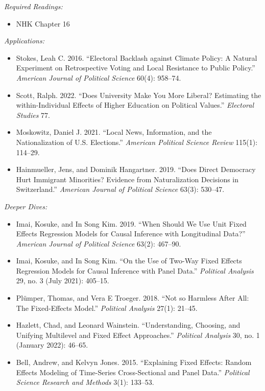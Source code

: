 \documentclass[11pt, letterpaper]{article}
\begin{document}
\textit{Required Readings:}

\begin{itemize}
	\item NHK Chapter 16
\end{itemize}

\noindent \textit{Applications:}

\begin{itemize}
	\item Stokes, Leah C. 2016. ``Electoral Backlash against Climate Policy: A Natural Experiment on Retrospective Voting and Local Resistance to Public Policy.'' \textit{American Journal of Political Science} 60(4): 958–74.
	\item Scott, Ralph. 2022. “Does University Make You More Liberal? Estimating the within-Individual Effects of Higher Education on Political Values.” \textit{Electoral Studies} 77.
	\item Moskowitz, Daniel J. 2021. “Local News, Information, and the Nationalization of U.S. Elections.” \textit{American Political Science Review} 115(1): 114–29.
	\item Hainmueller, Jens, and Dominik Hangartner. 2019. “Does Direct Democracy Hurt Immigrant Minorities? Evidence from Naturalization Decisions in Switzerland.” \textit{American Journal of Political Science} 63(3): 530–47.
\end{itemize}

\noindent \textit{Deeper Dives:}

\begin{itemize}
	\item Imai, Kosuke, and In Song Kim. 2019. ``When Should We Use Unit Fixed Effects Regression Models for Causal Inference with Longitudinal Data?'' \textit{American Journal of Political Science} 63(2): 467–90.
	\item Imai, Kosuke, and In Song Kim. ``On the Use of Two-Way Fixed Effects Regression Models for Causal Inference with Panel Data.'' \textit{Political Analysis} 29, no. 3 (July 2021): 405–15.
	\item Plümper, Thomas, and Vera E Troeger. 2018. “Not so Harmless After All: The Fixed-Effects Model.” \textit{Political Analysis} 27(1): 21–45.
	\item Hazlett, Chad, and Leonard Wainstein. ``Understanding, Choosing, and Unifying Multilevel and Fixed Effect Approaches.'' \textit{Political Analysis} 30, no. 1 (January 2022): 46–65.
	\item Bell, Andrew, and Kelvyn Jones. 2015. “Explaining Fixed Effects: Random Effects Modeling of Time-Series Cross-Sectional and Panel Data.” \textit{Political Science Research and Methods} 3(1): 133–53.
\end{itemize}
\end{document}
